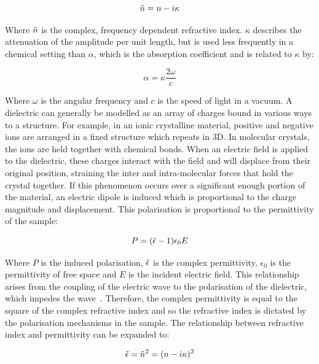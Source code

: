 \begin{equation}
\Tilde{n} = n - i\kappa
\end{equation}

Where \(\Tilde{n}\) is the complex, frequency dependent refractive index. \(\kappa\) describes the attenuation of the amplitude per unit length, but is used less frequently in a chemical setting than \(\alpha\), which is the absorption coefficient and is related to \(\kappa\) by:

\begin{equation}
\alpha = \kappa \frac{2\omega}{c}
\label{eqn:abs}
\end{equation}

Where \(\omega\) is the angular frequency and \(c\) is the speed of light in a vacuum. A dielectric can generally be modelled as an array of charges bound in various ways to a structure. For 
example, in an ionic crystalline material, positive and negative ions are arranged in a fixed structure which repeats in 3D. In molecular crystals, the ions are held together with chemical bonds. When an electric field is applied to the dielectric, these charges interact with the field and will displace from their original position, straining the inter and intra\nobreakdash-molecular forces that hold the crystal together. If this phenomenon occurs over a significant enough portion of the material, an electric dipole is induced which is proportional to the charge magnitude and displacement. This polarisation is proportional to the permittivity of the sample:

\begin{equation}
P = (\Tilde{\epsilon}-1) \epsilon_0 E
\end{equation}

Where \(P\) is the induced polarisation, \(\Tilde{\epsilon}\) is the complex permittivity, \(\epsilon_0\) is the permittivity of free space and \(E\) is the incident electric field. This relationship arises from the coupling of the electric wave to the polarisation of the dielectric, which impedes the wave~\cite{Kasap2006}. Therefore, the complex permittivity is equal to the square of the complex refractive index and so the refractive index is dictated by the polarisation mechanisms in the sample.  The relationship between refractive index and permittivity can be expanded to:

\begin{equation}
\Tilde{\epsilon} = \Tilde{n}^2 = (n - i\kappa)^2
\end{equation}

